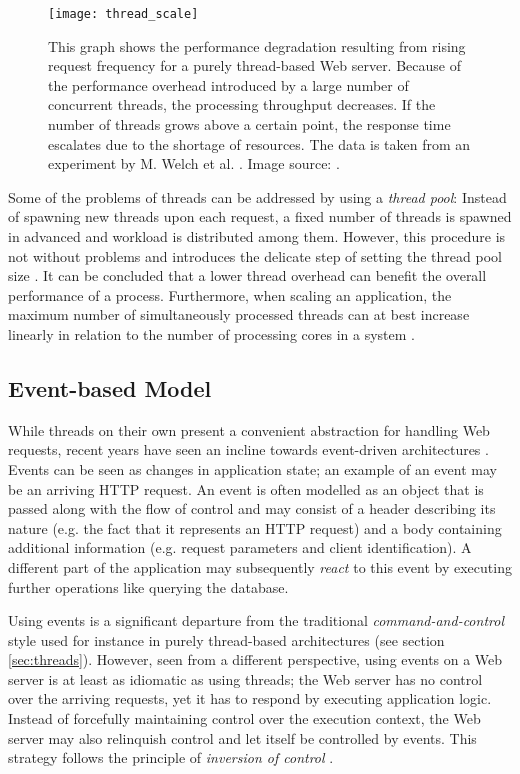 \begin{figure}
\centering\small
\setlength{\tabcolsep}{0mm}
  \texttt{[image: thread\_scale]}
\caption{
This graph shows the performance degradation resulting from rising request frequency for a purely thread-based Web server. Because of the performance overhead introduced by a large number of concurrent threads, the processing throughput decreases. If the number of threads grows above a certain point, the response time escalates due to the shortage of resources. The data is taken from an experiment by M. Welch et al. \cite{Welsh2001}. Image source: \cite{Welsh2001}.
}
\label{fig:thread_scale}
\end{figure}

Some of the problems of threads can be addressed by using a \textit{thread pool}: Instead of spawning new threads upon each request, a fixed number of threads is spawned in advanced and workload is distributed among them. However, this procedure is not without problems and introduces the delicate step of setting the thread pool size \cite{threadpools}. It can be concluded that a lower thread overhead can benefit the overall performance of a process. Furthermore, when scaling an application, the maximum number of simultaneously processed threads can at best increase linearly in relation to the number of processing cores in a system \cite{McCool}.

\subsection{Event-based Model}
\label{lab:events}
While threads on their own present a convenient abstraction for handling Web requests, recent years have seen an incline towards event-driven architectures \cite{Tilkov2010}. Events can be seen as changes in application state; an example of an event may be an arriving HTTP request. An event is often modelled as an object that is passed along with the flow of control and may consist of a header describing its nature (e.g. the fact that it represents an HTTP request) and a body containing additional information (e.g. request parameters and client identification). A different part of the application may subsequently \textit{react} to this event by executing further operations like querying the database.

Using events is a significant departure from the traditional \textit{command-and-control} style used for instance in purely thread-based architectures (see section \ref{sec:threads}). However, seen from a different perspective, using events on a Web server is at least as idiomatic as using threads; the Web server has no control over the arriving requests, yet it has to respond by executing application logic. Instead of forcefully maintaining control over the execution context, the Web server may also relinquish control and let itself be controlled by events. This strategy follows the principle of \textit{inversion of control} \cite{Hohpe2006}. 

